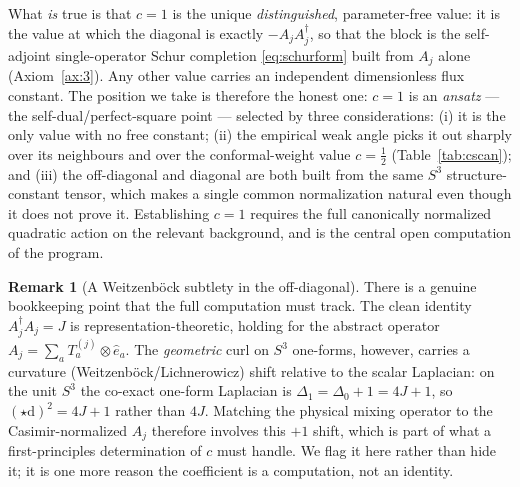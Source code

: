 \documentclass[11pt]{article}
\theoremstyle{plain}
\theoremstyle{definition}
\newtheorem{remark}[theorem]{Remark}
\newcommand{\dd}{\mathrm{d}}
\begin{document}
What \emph{is} true is that $c=1$ is the unique \emph{distinguished},
parameter-free value: it is the value at which the diagonal is exactly
$-A_jA_j^\dagger$, so that the block is the self-adjoint single-operator Schur
completion \eqref{eq:schurform} built from $A_j$ alone (Axiom~\ref{ax:3}).
Any other value carries an independent dimensionless flux constant. The position we take is therefore the honest
one: $c=1$ is an \emph{ansatz} --- the self-dual/perfect-square point ---
selected by three considerations: (i) it is the only value with no free
constant; (ii) the empirical weak angle picks it out sharply over its
neighbours and over the conformal-weight value $c=\tfrac12$
(Table~\ref{tab:cscan}); and (iii) the off-diagonal and diagonal are both
built from the same $S^3$ structure-constant tensor, which makes a single
common normalization natural even though it does not prove it. Establishing
$c=1$ requires the full canonically normalized quadratic action on the
relevant background, and is the central open computation of the program.

\begin{remark}[A Weitzenb\"ock subtlety in the off-diagonal]
There is a genuine bookkeeping point that the full computation must track.
The clean identity $A_j^\dagger A_j=J$ is representation-theoretic, holding
for the abstract operator $A_j=\sum_aT_a^{(j)}\otimes\hat e_a$. The
\emph{geometric} curl on $S^3$ one-forms, however, carries a curvature
(Weitzenb\"ock/Lichnerowicz) shift relative to the scalar Laplacian: on the
unit $S^3$ the co-exact one-form Laplacian is $\Delta_1=\Delta_0+1=4J+1$, so
$(\star\dd)^2=4J+1$ rather than $4J$. Matching the physical mixing operator
to the Casimir-normalized $A_j$ therefore involves this $+1$ shift, which is
part of what a first-principles determination of $c$ must handle. We flag it
here rather than hide it; it is one more reason the coefficient is a
computation, not an identity.
\end{remark}
\end{document}

